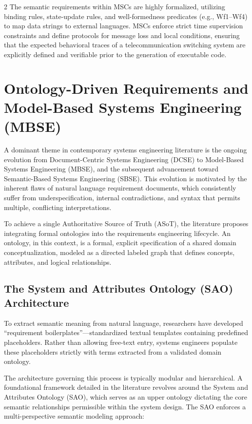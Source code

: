 \documentclass[11pt,letterpaper]{article}
\begin{document}
\begin{multicols*}{2}
The semantic requirements within MSCs are highly formalized, utilizing binding rules, state-update rules, and well-formedness predicates (e.g., Wf1–Wf4) to map data strings to external languages. MSCs enforce strict time supervision constraints and define protocols for message loss and local conditions, ensuring that the expected behavioral traces of a telecommunication switching system are explicitly defined and verifiable prior to the generation of executable code.

\section{Ontology-Driven Requirements and Model-Based Systems Engineering (MBSE)}
A dominant theme in contemporary systems engineering literature is the ongoing evolution from Document-Centric Systems Engineering (DCSE) to Model-Based Systems Engineering (MBSE), and the subsequent advancement toward Semantic-Based Systems Engineering (SBSE). This evolution is motivated by the inherent flaws of natural language requirement documents, which consistently suffer from underspecification, internal contradictions, and syntax that permits multiple, conflicting interpretations.

To achieve a single Authoritative Source of Truth (ASoT), the literature proposes integrating formal ontologies into the requirements engineering lifecycle. An ontology, in this context, is a formal, explicit specification of a shared domain conceptualization, modeled as a directed labeled graph that defines concepts, attributes, and logical relationships.

\subsection{The System and Attributes Ontology (SAO) Architecture}
To extract semantic meaning from natural language, researchers have developed ``requirement boilerplates''—standardized textual templates containing predefined placeholders. Rather than allowing free-text entry, systems engineers populate these placeholders strictly with terms extracted from a validated domain ontology.

The architecture governing this process is typically modular and hierarchical. A foundational framework detailed in the literature revolves around the System and Attributes Ontology (SAO), which serves as an upper ontology dictating the core semantic relationships permissible within the system design. The SAO enforces a multi-perspective semantic modeling approach:


\end{multicols*}
\end{document}
